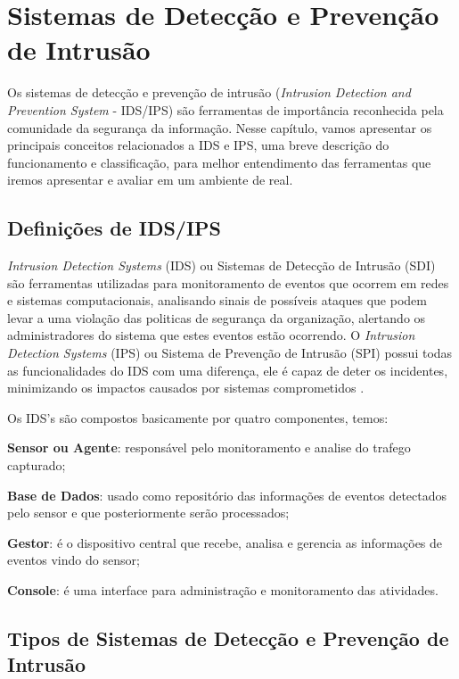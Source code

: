 \chapter{Sistemas de Detecção e Prevenção de Intrusão} \label{ch:idps}

Os sistemas de detecção e prevenção de intrusão (\textit{Intrusion Detection and Prevention System} - IDS/IPS) são ferramentas de importância reconhecida pela comunidade da segurança da informação. Nesse capítulo, vamos apresentar os principais conceitos relacionados a IDS e IPS, uma breve descrição do funcionamento e classificação, para melhor entendimento das ferramentas que iremos apresentar e avaliar em um ambiente de real.

\section{Definições de IDS/IPS} \label{sec:ipds-definicoes}

\textit{Intrusion Detection Systems} (IDS) ou Sistemas de Detecção de Intrusão (SDI) são ferramentas utilizadas para monitoramento de eventos que ocorrem em redes e sistemas computacionais, analisando sinais de possíveis ataques que podem levar a uma violação das politicas de segurança da organização, alertando os administradores do sistema que estes eventos estão ocorrendo. O \textit{Intrusion Detection Systems} (IPS) ou Sistema de Prevenção de Intrusão (SPI) possui todas as funcionalidades do IDS com uma diferença, ele é capaz de deter os incidentes, minimizando os impactos causados por sistemas comprometidos \cite{mukhopadhyay01}.

Os IDS's são compostos basicamente por quatro componentes, temos: 
\begin{alineas}
\item \textbf{Sensor ou Agente}: responsável pelo monitoramento e analise do trafego capturado; 
\item \textbf{Base de Dados}: usado como repositório das informações de eventos detectados pelo sensor e que posteriormente serão processados;
\item \textbf{Gestor}: é o dispositivo central que recebe, analisa e gerencia as informações de eventos vindo do sensor; 
\item \textbf{Console}: é uma interface para administração e monitoramento das atividades.
\end{alineas}

\section{Tipos de Sistemas de Detecção e Prevenção de Intrusão} \label{sec:idps-tipos}

